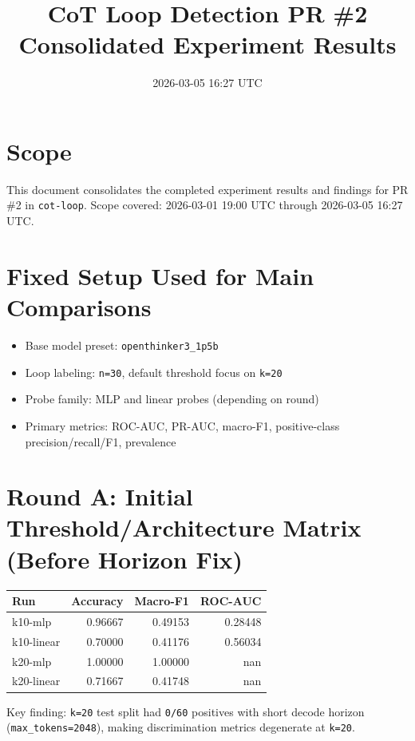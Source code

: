 \documentclass[11pt]{article}
\title{CoT Loop Detection PR \#2\\Consolidated Experiment Results}
\author{}
\date{2026-03-05 16:27 UTC}
\begin{document}
\maketitle

\section*{Scope}
This document consolidates the completed experiment results and findings for PR \#2 in \texttt{cot-loop}. Scope covered: 2026-03-01 19:00 UTC through 2026-03-05 16:27 UTC.

\section*{Fixed Setup Used for Main Comparisons}
\begin{itemize}
  \item Base model preset: \texttt{openthinker3\_1p5b}
  \item Loop labeling: \texttt{n=30}, default threshold focus on \texttt{k=20}
  \item Probe family: MLP and linear probes (depending on round)
  \item Primary metrics: ROC-AUC, PR-AUC, macro-F1, positive-class precision/recall/F1, prevalence
\end{itemize}

\section*{Round A: Initial Threshold/Architecture Matrix (Before Horizon Fix)}
\begin{center}
\begin{tabular}{@{}lrrr@{}}
\toprule
Run & Accuracy & Macro-F1 & ROC-AUC \\
\midrule
k10-mlp & 0.96667 & 0.49153 & 0.28448 \\
k10-linear & 0.70000 & 0.41176 & 0.56034 \\
k20-mlp & 1.00000 & 1.00000 & nan \\
k20-linear & 0.71667 & 0.41748 & nan \\
\bottomrule
\end{tabular}
\end{center}

\noindent
Key finding: \texttt{k=20} test split had \texttt{0/60} positives with short decode horizon (\texttt{max\_tokens=2048}), making discrimination metrics degenerate at \texttt{k=20}.
\end{document}
